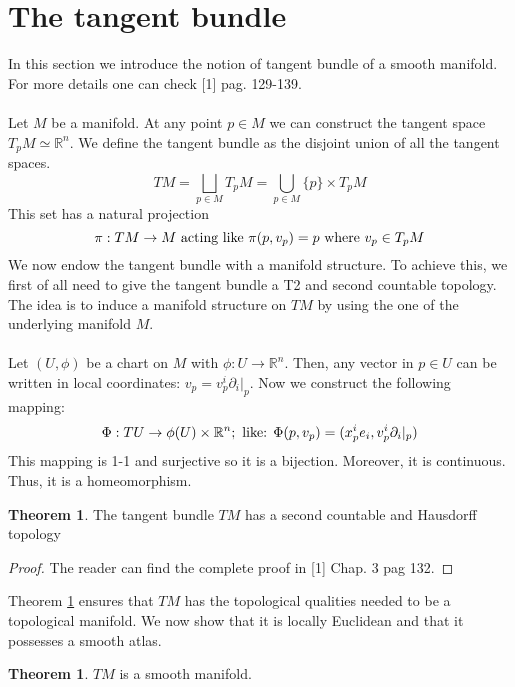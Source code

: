 \documentclass[12pt,a4paper]{report}
\theoremstyle{definition}
\theoremstyle{Theorem}
\newtheorem{Theo}[Def]{Theorem}
\theoremstyle{definition}
\theoremstyle{definition}
\begin{document}
	\section{The tangent bundle}
	In this section we introduce the notion of tangent bundle of a smooth manifold. For more details one can check [1] pag. 129-139.\\
	\\
	Let $M$ be a manifold. At any point $p\in M$ we can construct the tangent space $T_pM\simeq \mathbb{R}^n$. We define the tangent bundle as the disjoint union of all the tangent spaces.
	$$TM=\bigsqcup_{p\in M}T_pM=\bigcup_{p\in M} \{p\}\times T_pM$$
	This set has a natural projection 
	$$\pi:TM\rightarrow M\hbox{ acting like }\pi(p,v_p)=p \hbox{ where }v_p\in T_pM$$  
	We now endow the tangent bundle with a manifold structure. To achieve this, we first of all need to give the tangent bundle a T2 and second countable topology. The idea is to induce a manifold structure on $TM$ by using the one of the underlying manifold $M$.\\
	\\
	Let $(U,\phi)$ be a chart on $M$ with $\phi:U\rightarrow \mathbb{R}^n$. Then, any vector in $p\in U$ can be written in local coordinates: $v_p=v^i_p\partial_i|_p$. Now we construct the following mapping:
	$$\Phi:TU\rightarrow \phi(U)\times \mathbb{R}^n; \hbox{ like: }
	\Phi(p,v_p)=(x^i_pe_i,v^i_p\partial_i|_p)$$
	This mapping is 1-1 and surjective so it is a bijection. Moreover, it is continuous. Thus, it is a homeomorphism.
	\begin{Theo} \label{Theo_1.1}
		The tangent bundle $TM$ has a second countable and Hausdorff topology
	\end{Theo}
	\begin{proof}
		The reader can find the complete proof in [1] Chap. 3 pag 132.
	\end{proof}
	Theorem \ref{Theo_1.1} ensures that $TM$ has the topological qualities needed to be a topological manifold. We now show that it is locally Euclidean and that it possesses a smooth atlas.
	\begin{Theo}
		$TM$ is a smooth manifold.
	\end{Theo}
\end{document}
